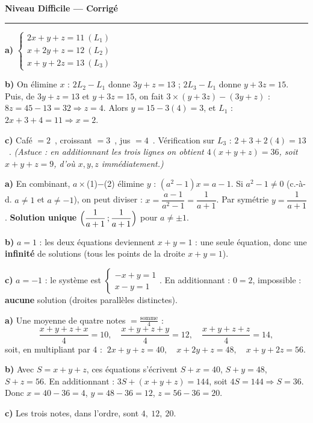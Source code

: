 \documentclass[11pt,a4paper]{article}
\newcommand{\euro}{\texteuro}
\newcommand{\ds}{\displaystyle}
\begin{document}
\begin{center}
{\LARGE\bfseries\color{primarydark} Niveau Difficile — Corrigé}\\[2pt]
{\color{primary}\rule{0.45\textwidth}{1.2pt}}
\end{center}
\vspace{1mm}

\begin{corrige}
\textbf{a)} $\ds\begin{cases} 2x+y+z=11\ (L_1)\\ x+2y+z=12\ (L_2)\\ x+y+2z=13\ (L_3)\end{cases}$

\smallskip
\textbf{b)} On élimine $x$ : $2L_2-L_1$ donne $3y+z=13$ ; $2L_3-L_1$ donne $y+3z=15$. Puis, de
$3y+z=13$ et $y+3z=15$, on fait $3\times(y+3z)-(3y+z)$ : $8z=45-13=32\Rightarrow z=4$. Alors
$y=15-3(4)=3$, et $L_1$ : $2x+3+4=11\Rightarrow x=2$.

\smallskip
\textbf{c)} Café $=2$~\euro, croissant $=3$~\euro, jus $=4$~\euro. Vérification sur $L_3$ :
$2+3+2(4)=13$~\euro \checkmark. \emph{(Astuce : en additionnant les trois lignes on obtient
$4(x+y+z)=36$, soit $x+y+z=9$, d'où $x,y,z$ immédiatement.)}
\end{corrige}

\begin{corrige}
\textbf{a)} En combinant, $a\times$(1)$-$(2) élimine $y$ : $(a^{2}-1)x=a-1$. Si $a^{2}-1\neq0$
(c.-à-d. $a\neq1$ et $a\neq-1$), on peut diviser : $x=\dfrac{a-1}{a^{2}-1}=\dfrac{1}{a+1}$. Par symétrie
$y=\dfrac{1}{a+1}$. \textbf{Solution unique} $\Bigl(\dfrac{1}{a+1}\,;\dfrac{1}{a+1}\Bigr)$ pour $a\neq\pm1$.

\smallskip
\textbf{b)} $a=1$ : les deux équations deviennent $x+y=1$ : une seule équation, donc une \textbf{infinité}
de solutions (tous les points de la droite $x+y=1$).

\smallskip
\textbf{c)} $a=-1$ : le système est $\begin{cases}-x+y=1\\ x-y=1\end{cases}$. En additionnant : $0=2$,
impossible : \textbf{aucune} solution (droites parallèles distinctes).
\end{corrige}

\begin{corrige}
\textbf{a)} Une moyenne de quatre notes $=\tfrac{\text{somme}}{4}$ :
\[ \frac{x+y+z+x}{4}=10,\quad \frac{x+y+z+y}{4}=12,\quad \frac{x+y+z+z}{4}=14, \]
soit, en multipliant par $4$ : $\ 2x+y+z=40,\quad x+2y+z=48,\quad x+y+2z=56.$

\smallskip
\textbf{b)} Avec $S=x+y+z$, ces équations s'écrivent $S+x=40$, $S+y=48$, $S+z=56$. En additionnant :
$3S+(x+y+z)=144$, soit $4S=144\Rightarrow S=36$. Donc $x=40-36=4$, $y=48-36=12$, $z=56-36=20$.

\smallskip
\textbf{c)} Les trois notes, dans l'ordre, sont $\boxed{4,\ 12,\ 20}$.
\end{corrige}
\end{document}
